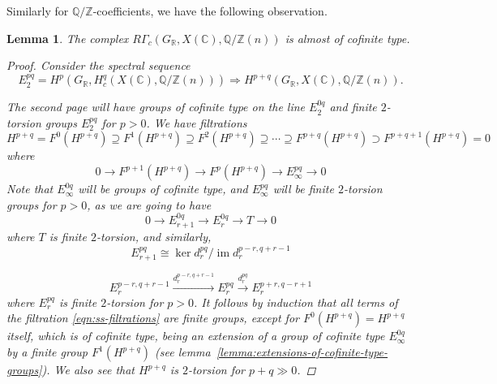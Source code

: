 \documentclass[leqno,12pt]{article}
\theoremstyle{plain}
\newtheorem{lemma}[theorem]{\indent\sc Lemma}
\theoremstyle{definition}
\DeclareMathOperator{\im}{im}
\newcommand{\ZZ}{\mathbb{Z}}
\newcommand{\QQ}{\mathbb{Q}}
\newcommand{\RR}{\mathbb{R}}
\newcommand{\CC}{\mathbb{C}}
\begin{document}
Similarly for $\QQ/\ZZ$-coefficients, we have the following observation.

\begin{lemma}
  \label{lemma:RGammac(GR,X(C),Q/Z(n))-almost-cofinite-type}
  The complex $R\Gamma_c (G_\RR, X (\CC), \QQ/\ZZ (n))$
  is almost of cofinite type.

  \begin{proof}
    Consider the spectral sequence
    \[ E_2^{pq} = H^p (G_\RR, H^q_c (X (\CC), \QQ/\ZZ (n)))
    \Longrightarrow
    H^{p+q} (G_\RR, X (\CC), \QQ/\ZZ (n)). \]

    The second page will have groups of cofinite type on the line $E_2^{0q}$ and
    finite $2$-torsion groups $E_2^{pq}$ for $p > 0$. We have filtrations
    \begin{equation}
      \label{eqn:ss-filtrations}
      H^{p+q} = F^0 (H^{p+q}) \supseteq
      F^1 (H^{p+q}) \supseteq
      F^2 (H^{p+q}) \supseteq \cdots \supseteq
      F^{p+q} (H^{p+q}) \supset F^{p+q+1} (H^{p+q}) = 0
    \end{equation}
    where
    $$0 \to F^{p+1} (H^{p+q}) \to F^p (H^{p+q}) \to E_\infty^{pq} \to 0$$
    Note that $E^{0q}_\infty$ will be groups of cofinite type, and
    $E^{pq}_\infty$ will be finite $2$-torsion groups for $p > 0$, as we are
    going to have
    $$0 \to E_{r+1}^{0q} \to E_r^{0q} \to T \to 0$$
    where $T$ is finite $2$-torsion, and similarly,
    $$E_{r+1}^{pq} \cong \ker d_r^{pq} / \im d_r^{p-r,q+r-1}$$

    \[ E_r^{p-r,q+r-1} \xrightarrow{d_r^{p-r,q+r-1}}
    E_r^{pq} \xrightarrow{d_r^{pq}} E_r^{p+r,q-r+1} \]
    where $E_r^{pq}$ is finite $2$-torsion for $p > 0$. It follows by induction
    that all terms of the filtration \eqref{eqn:ss-filtrations} are finite
    groups, except for $F^0 (H^{p+q}) = H^{p+q}$ itself, which is of cofinite
    type, being an extension of a group of cofinite type $E_\infty^{0q}$ by a
    finite group $F^1 (H^{p+q})$
    (see lemma~\ref{lemma:extensions-of-cofinite-type-groups}). We also see that
    $H^{p+q}$ is $2$-torsion for $p+q \gg 0$.
  \end{proof}
\end{lemma}
\end{document}
